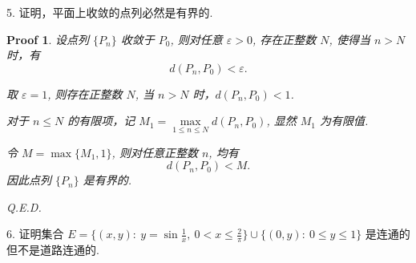 \documentclass[a4paper,12pt]{article}
\newtheorem*{pf}{Proof}
\begin{document}
5. 证明，平面上收敛的点列必然是有界的.

\begin{pf}
    设点列 $\{P_n\}$ 收敛于 $P_0$, 则对任意 $\varepsilon > 0$, 存在正整数 $N$, 使得当 $n > N$ 时，有
    $$
        d(P_n, P_0) < \varepsilon.
    $$

    取 $\varepsilon = 1$, 则存在正整数 $N$, 当 $n > N$ 时，$d(P_n, P_0) < 1$.

    对于 $n \leq N$ 的有限项，记 $M_1 = \max\limits_{1 \leq n \leq N} d(P_n, P_0)$, 显然 $M_1$ 为有限值.

    令 $M = \max\{M_1, 1\}$, 则对任意正整数 $n$, 均有
    $$
        d(P_n, P_0) < M.
    $$
    因此点列 $\{P_n\}$ 是有界的.

    Q.E.D.
\end{pf}

6. 证明集合 $E = \{(x,y) :\ y = \sin \frac{1}{x},\ 0 < x \leqslant \frac{2}{\pi}\} \cup \{(0,y) :\ 0 \leqslant y \leqslant 1\}$ 是连通的但不是道路连通的.
\end{document}
